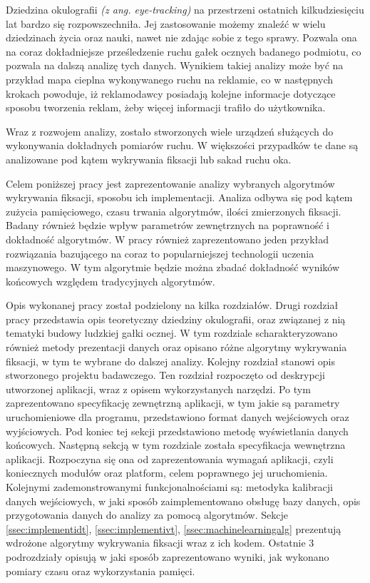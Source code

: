 Dziedzina okulografii \textit{(z ang. eye-tracking)} na przestrzeni ostatnich kilkudziesięciu lat bardzo się rozpowszechniła. Jej zastosowanie możemy znaleźć w wielu dziedzinach życia oraz nauki, nawet nie zdając sobie z tego sprawy. Pozwala ona na coraz dokładniejsze prześledzenie ruchu gałek ocznych badanego podmiotu, co pozwala na dalszą analizę tych danych. Wynikiem takiej analizy może być na przykład mapa cieplna wykonywanego ruchu na reklamie, co w następnych krokach powoduje, iż reklamodawcy posiadają kolejne informacje dotyczące sposobu tworzenia reklam, żeby więcej informacji trafiło do użytkownika.\par
Wraz z rozwojem analizy, zostało stworzonych wiele urządzeń służących do wykonywania dokładnych pomiarów ruchu. W większości przypadków te dane są analizowane pod kątem wykrywania fiksacji lub sakad ruchu oka.\par
Celem poniższej pracy jest zaprezentowanie analizy wybranych algorytmów wykrywania fiksacji, sposobu ich implementacji. Analiza odbywa się pod kątem zużycia pamięciowego, czasu trwania algorytmów, ilości zmierzonych fiksacji. Badany również będzie wpływ parametrów zewnętrznych na poprawność i dokładność algorytmów. W pracy również zaprezentowano jeden przykład rozwiązania bazującego na coraz to popularniejszej technologii uczenia maszynowego. W tym algorytmie będzie można zbadać dokładność wyników końcowych względem tradycyjnych algorytmów.\par
Opis wykonanej pracy został podzielony na kilka rozdziałów. Drugi rozdział pracy przedstawia opis teoretyczny dziedziny okulografii, oraz związanej z nią tematyki budowy ludzkiej gałki ocznej. W tym rozdziale scharakteryzowano również metody prezentacji danych oraz opisano różne algorytmy wykrywania fiksacji, w tym te wybrane do dalszej analizy. Kolejny rozdział stanowi opis stworzonego projektu badawczego. Ten rozdział rozpoczęto od deskrypcji utworzonej aplikacji, wraz z opisem wykorzystanych narzędzi. Po tym zaprezentowano specyfikację zewnętrzną aplikacji, w tym jakie są parametry uruchomieniowe dla programu, przedstawiono format danych wejściowych oraz wyjściowych. Pod koniec tej sekcji przedstawiono metodę wyświetlania danych końcowych. Następną sekcją w tym rozdziale została specyfikacja wewnętrzna aplikacji. Rozpoczyna się ona od zaprezentowania wymagań aplikacji, czyli koniecznych modułów oraz platform, celem poprawnego jej uruchomienia. Kolejnymi zademonstrowanymi funkcjonalnościami są: metodyka kalibracji danych wejściowych, w jaki sposób zaimplementowano obsługę bazy danych, opis przygotowania danych do analizy za pomocą algorytmów. Sekcje \ref{ssec:implementidt}, \ref{ssec:implementivt}, \ref{ssec:machinelearningalg} prezentują wdrożone algorytmy wykrywania fiksacji wraz z ich kodem. Ostatnie 3 podrozdziały opisują w jaki sposób zaprezentowano wyniki, jak wykonano pomiary czasu oraz wykorzystania pamięci.\\
